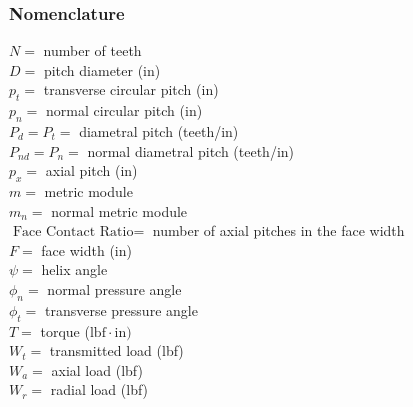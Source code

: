 \documentclass[11pt, fleqn]{article}
\begin{document}
\subsubsection{Nomenclature}
$N=$ number of teeth\\
$D=$ pitch diameter (in)\\
$p_t=$ transverse circular pitch (in)\\
$p_n=$ normal circular pitch (in)\\
$P_d=P_t=$ diametral pitch (teeth/in)\\
$P_{nd}=P_n=$ normal diametral pitch (teeth/in)\\
$p_x=$ axial pitch (in)\\
$m=$ metric module\\
$m_n=$ normal metric module\\
$\text{Face Contact Ratio}=$ number of axial pitches in the face width\\
$F=$ face width (in)\\
$\psi=$ helix angle\\
$\phi_n=$ normal pressure angle\\
$\phi_t=$ transverse pressure angle\\
$T=$ torque ($\mathrm{lbf\cdot in})$\\
$W_t=$ transmitted load (lbf)\\
$W_a=$ axial load (lbf)\\
$W_r=$ radial load (lbf)\\
\end{document}
